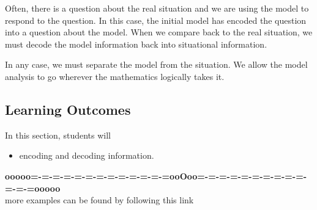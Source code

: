 \documentclass{ximera}
\begin{document}
Often, there is a question about the real situation and we are using the model to respond to the question.  In this case, the initial model has encoded the question into a question about the model.  When we compare back to the real situation, we must decode the model information back into situational information.


In any case, we must separate the model from the situation.  We allow the model analysis to go wherever the mathematics logically takes it.







\subsection{Learning Outcomes}


\begin{sectionOutcomes}
In this section, students will 

\begin{itemize}
\item encoding and decoding information.
\end{itemize}
\end{sectionOutcomes}









\begin{center}
\textbf{\textcolor{green!50!black}{ooooo=-=-=-=-=-=-=-=-=-=-=-=-=ooOoo=-=-=-=-=-=-=-=-=-=-=-=-=ooooo}} \\

more examples can be found by following this link\\ 

\end{center}
\end{document}
